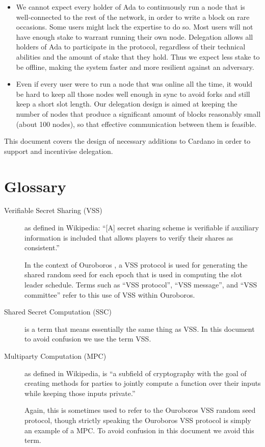 \documentclass[11pt,a4paper]{article}
\begin{document}
\begin{itemize}
\item
  We cannot expect every holder of Ada to continuously run a node that
  is well-connected to the rest of the network, in order to write a
  block on rare occasions. Some users might lack the expertise to do so.
  Most users will not have enough stake to warrant running their own
  node. Delegation allows all holders of Ada to participate in the
  protocol, regardless of their technical abilities and the amount of
  stake that they hold. Thus we expect less stake to be offline, making
  the system faster and more resilient against an adversary.
\item
  Even if every user were to run a node that was online all the time, it
  would be hard to keep all those nodes well enough in sync to avoid
  forks and still keep a short slot length. Our delegation design is
  aimed at keeping the number of nodes that produce a significant amount
  of blocks reasonably small (about 100 nodes), so that effective
  communication between them is feasible.
\end{itemize}

This document covers the design of necessary additions to Cardano in
order to support and incentivise delegation.

\section{Glossary}
\label{glossary}

\begin{description}
\item[Verifiable Secret Sharing (VSS)] as defined in Wikipedia: ``[A] secret
  sharing scheme is verifiable if auxiliary information is included that
  allows players to verify their shares as consistent.''

  In the context of Ouroboros \citep{ouroboros_classic}, a VSS protocol is used
  for generating the shared random seed for each epoch that is used in
  computing the slot leader schedule. Terms such as ``VSS protocol'',
  ``VSS message'', and ``VSS committee'' refer to this use of VSS within
  Ouroboros.

\item[Shared Secret Computation (SSC)] is a term that means essentially the
  same thing as VSS. In this document to avoid confusion we use the term VSS.

\item[Multiparty Computation (MPC)] as defined in Wikipedia, is ``a subfield
  of cryptography with the goal of creating methods for parties to jointly
  compute a function over their inputs while keeping those inputs private.''

  Again, this is sometimes used to refer to the Ouroboros VSS random seed
  protocol, though strictly speaking the Ouroboros VSS protocol is simply an
  example of a MPC. To avoid confusion in this document we avoid this term.
\end{description}
\end{document}
